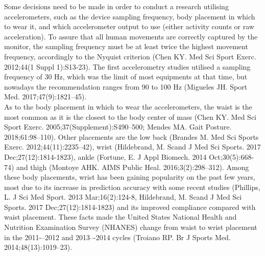 \documentclass[11pt]{article}
\begin{document}
Some decisions need to be made in order to conduct a research utilising accelerometers, such as the device sampling frequency, body placement in which to wear it, and which accelerometer output to use (either activity counts or raw acceleration). To assure that all human movements are correctly captured by the monitor, the sampling frequency must be at least twice the highest movement frequency, accordingly to the Nyquist criterion {\tiny (Chen KY. Med Sci Sport Exerc. 2012;44(1 Suppl 1):S13-23)}. The first accelerometry studies utilised a sampling frequency of 30 Hz, which was the limit of most equipments at that time, but nowadays the recommendation ranges from 90 to 100 Hz {\tiny (Migueles JH. Sport Med. 2017;47(9):1821–45)}. \\

As to the body placement in which to wear the accelerometers, the waist is the most common as it is the closest to the body center of mass {\tiny (Chen KY. Med Sci Sport Exerc. 2005;37(Supplement):S490–500; Mendes MA. Gait Posture. 2018;61:98–110)}. Other placements are the low back {\tiny (Brandes M. Med Sci Sports Exerc. 2012;44(11):2235–42)}, wrist {\tiny (Hildebrand, M. Scand J Med Sci Sports. 2017 Dec;27(12):1814-1823)}, ankle {\tiny (Fortune, E. J Appl Biomech. 2014 Oct;30(5):668-74)} and thigh {\tiny (Montoye AHK. AIMS Public Heal. 2016;3(2):298–312)}. Among these body placements, wrist has been gaining popularity on the past few years, most due to its increase in prediction accuracy with  some recent studies {\tiny (Phillips, L. J Sci Med Sport. 2013 Mar;16(2):124-8, Hildebrand, M. Scand J Med Sci Sports. 2017 Dec;27(12):1814-1823)} and its improved compliance compared with waist placement. These facts made the United States National Health and Nutrition Examination Survey (NHANES) change from waist to wrist placement in the 2011-–2012 and 2013–-2014 cycles {\tiny (Troiano RP. Br J Sports Med. 2014;48(13):1019–23)}.
\end{document}
